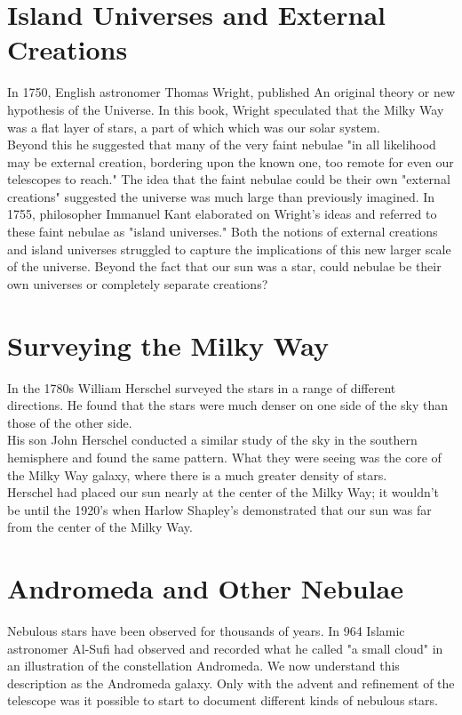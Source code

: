 \documentclass[16pt, a4 paper,two column]{article}
\begin{document}
\section{Island Universes and External Creations}
In 1750, English astronomer Thomas Wright, published An original theory or new hypothesis of the Universe.  In this book, Wright speculated that the Milky Way was a flat layer of stars, a part of which which was our solar system.\\

Beyond this he suggested that many of the very faint nebulae "in all likelihood may be external creation, bordering upon the known one, too remote for even our telescopes to reach." The idea that the faint nebulae could be their own "external creations" suggested the universe was much large than previously imagined. In 1755, philosopher Immanuel Kant elaborated on Wright's ideas and referred to these faint nebulae as "island universes." Both the notions of external creations and island universes struggled to capture the implications of this new larger scale of the universe. Beyond the fact that our sun was a star, could nebulae be their own universes or completely separate creations?

\section{Surveying the Milky Way}
In the 1780s William Herschel surveyed the stars in a range of different directions. He found that the stars were much denser on one side of the sky than those of the other side.\\

His son John Herschel conducted a similar study of the sky in the southern hemisphere and found the same pattern. What they were seeing was the core of the Milky Way galaxy, where there is a much greater density of stars.\\

Herschel had placed our sun nearly at the center of the Milky Way; it wouldn't be until the 1920's when Harlow Shapley's demonstrated that our sun was far from the center of the Milky Way.\\

\section{Andromeda and Other Nebulae}
Nebulous stars have been observed for thousands of years. In 964 Islamic astronomer Al-Sufi had observed and recorded what he called "a small cloud" in an illustration of the constellation Andromeda. We now understand this description as the Andromeda galaxy. Only with the advent and refinement of the telescope was it possible to start to document different kinds of nebulous stars.\\
\end{document}
